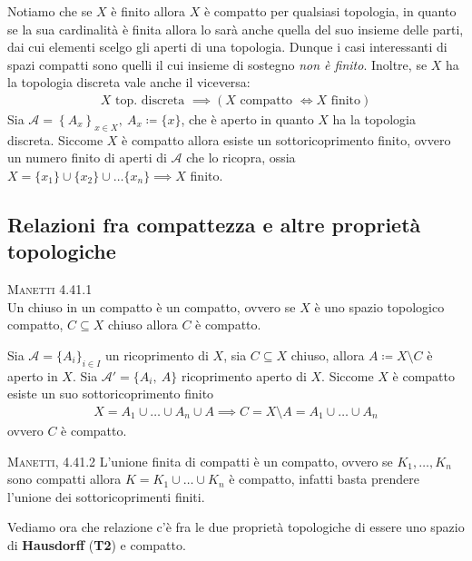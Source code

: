 \begin{observe}
Notiamo che se $X$ è finito allora $X$ è compatto per qualsiasi topologia, in quanto se la sua cardinalità è finita allora lo sarà anche quella del suo insieme delle parti, dai cui elementi scelgo gli aperti di una topologia. Dunque i casi interessanti di spazi compatti sono quelli il cui insieme di sostegno \textit{non è finito}.\newline
Inoltre, se $X$ ha la topologia discreta vale anche il viceversa:
	\begin{gather*}
		X \text{ top. discreta } \implies \left( X \text{ compatto } \iff X \text{ finito}\right)
	\end{gather*}
Sia $\mathcal{A}=\left\{ A_x\right\}_{x\in X}, \ A_x\coloneqq \{x\}$, che è aperto in quanto $X$ ha la topologia discreta. Siccome $X$ è compatto allora esiste un sottoricoprimento finito, ovvero un numero finito di aperti di $\mathcal{A}$ che lo ricopra, ossia $X=\{x_1\}\cup\{x_2\}\cup\dots\{x_n\}\implies X$ finito.
\end{observe}
\subsection{Relazioni fra compattezza e altre proprietà topologiche}
\begin{theorema}\textsc{Manetti 4.41.1} \label{chiuso in compatto}\\
	Un chiuso in un compatto è un compatto, ovvero se $X$ è uno spazio topologico compatto, $C\subseteq X$ chiuso allora $C$ è compatto.
\end{theorema}
\begin{demonstration}
	Sia $\mathcal{A}=\{A_i \}_{i\in I}$ un ricoprimento di $X$, sia $C\subseteq X$ chiuso, allora $A\coloneqq X\setminus C$ è aperto in $X$.\newline
	Sia $\mathcal{A}'=\{A_i,\ A\}$ ricoprimento aperto di $X$. Siccome $X$ è compatto esiste un suo sottoricoprimento finito
		\begin{gather*}
			X=A_1\cup\dots\cup A_n\cup A \implies C=X\setminus A=A_1\cup\dots\cup A_n
		\end{gather*}
	ovvero $C$ è compatto.
\end{demonstration}

\begin{observe}\textsc{Manetti, 4.41.2}
	L'unione finita di compatti è un compatto, ovvero se $K_1,\dots,K_n$ sono compatti allora $K=K_1\cup\dots\cup K_n$ è compatto, infatti basta prendere l'unione dei sottoricoprimenti finiti.
\end{observe}
Vediamo ora che relazione c'è fra le due proprietà topologiche di essere uno spazio di \textbf{Hausdorff} (\textbf{T2}) e compatto.

